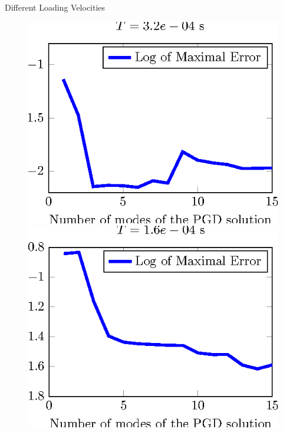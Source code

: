 \documentclass[12pt]{beamer}
\begin{document}
\begin{frame}{Different Loading Velocities}
	\begin{figure}
		\begin{minipage}{0.24\linewidth}
			\includegraphics[width=1\linewidth]{Error-CalculSchem3-T4-tikz.eps}
		\end{minipage}
		\begin{minipage}{0.24\linewidth}
			\includegraphics[width=1\linewidth]{Error-CalculSchem3-T3-tikz.eps}
		\end{minipage}
		\begin{minipage}{0.24\linewidth}

\end{minipage}
\end{figure}
\end{frame}
\end{document}
